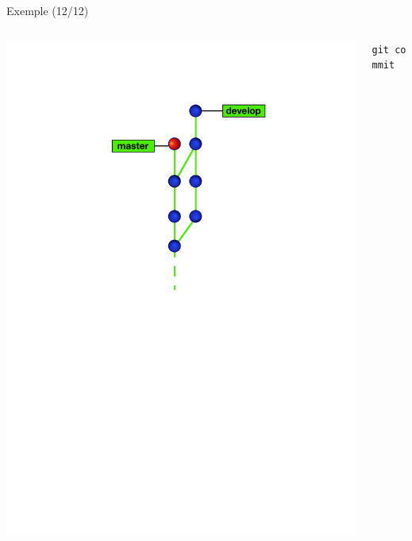 \begin{frame}[fragile]{%
\protect\hypertarget{exemple-1212}{%
Exemple (12/12)}}

\begin{columns}[T]
\begin{column}{0.40\textwidth}
\includegraphics[width=1\textwidth]{images/branch12.pdf}
\end{column}

\begin{column}{0.60\textwidth}
\texttt{git\ commit}
\end{column}
\end{columns}

\end{frame}

